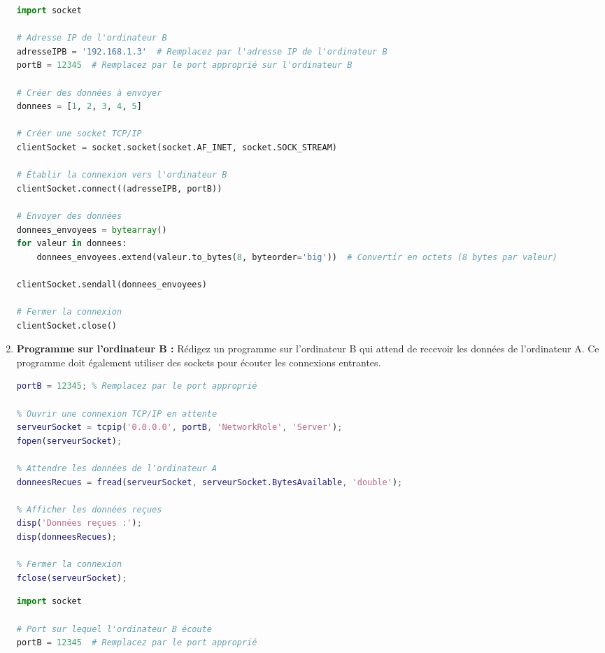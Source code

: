 \begin{enumerate}
\begin{lstlisting}[language=Python, caption={Programme Python sur l'ordinateur A (l'émetteur)}]
import socket

# Adresse IP de l'ordinateur B
adresseIPB = '192.168.1.3'  # Remplacez par l'adresse IP de l'ordinateur B
portB = 12345  # Remplacez par le port approprié sur l'ordinateur B

# Créer des données à envoyer
donnees = [1, 2, 3, 4, 5]

# Créer une socket TCP/IP
clientSocket = socket.socket(socket.AF_INET, socket.SOCK_STREAM)

# Établir la connexion vers l'ordinateur B
clientSocket.connect((adresseIPB, portB))

# Envoyer des données
donnees_envoyees = bytearray()
for valeur in donnees:
    donnees_envoyees.extend(valeur.to_bytes(8, byteorder='big'))  # Convertir en octets (8 bytes par valeur)

clientSocket.sendall(donnees_envoyees)

# Fermer la connexion
clientSocket.close()
\end{lstlisting}


    \item \textbf{Programme sur l'ordinateur B :} Rédigez un programme sur l'ordinateur B qui attend de recevoir les données de l'ordinateur A. Ce programme doit également utiliser des sockets pour écouter les connexions entrantes.
    
\begin{lstlisting}[language=Matlab, caption={Programme MATLAB sur l'ordinateur B (le récepteur)}]
% Port sur lequel l'ordinateur B écoute
portB = 12345; % Remplacez par le port approprié

% Ouvrir une connexion TCP/IP en attente
serveurSocket = tcpip('0.0.0.0', portB, 'NetworkRole', 'Server');
fopen(serveurSocket);

% Attendre les données de l'ordinateur A
donneesRecues = fread(serveurSocket, serveurSocket.BytesAvailable, 'double');

% Afficher les données reçues
disp('Données reçues :');
disp(donneesRecues);

% Fermer la connexion
fclose(serveurSocket);
\end{lstlisting}

\begin{lstlisting}[language=Python, caption={Programme Python sur l'ordinateur B (le récepteur)}]
import socket

# Port sur lequel l'ordinateur B écoute
portB = 12345  # Remplacez par le port approprié


\end{lstlisting}
\end{enumerate}
